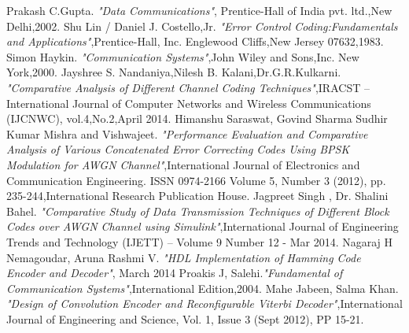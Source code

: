 \documentclass[conference]{IEEEtran}
\begin{document}
\begin{thebibliography}{50}
 Prakash C.Gupta. \textsl{"Data Communications"},
Prentice-Hall of India pvt. ltd.,New Delhi,2002.
 Shu Lin / Daniel J. Costello,Jr. \textsl{"Error Control Coding:Fundamentals and Applications"},Prentice-Hall, Inc. Englewood Cliffs,New Jersey 07632,1983.
 Simon Haykin. \textsl{"Communication Systems"},John Wiley and Sons,Inc. New York,2000.
Jayshree S. Nandaniya,Nilesh B. Kalani,Dr.G.R.Kulkarni. \textsl{"Comparative Analysis of Different Channel Coding Techniques"},IRACST – International Journal of Computer Networks and Wireless Communications (IJCNWC), vol.4,No.2,April 2014.
 Himanshu Saraswat, Govind Sharma Sudhir Kumar Mishra and Vishwajeet. \textsl{"Performance Evaluation and Comparative Analysis
of Various Concatenated Error Correcting Codes Using BPSK Modulation for AWGN Channel"},International Journal of Electronics and Communication Engineering.
ISSN 0974-2166 Volume 5, Number 3 (2012), pp. 235-244,International Research Publication House.
 Jagpreet Singh , Dr. Shalini Bahel. \textsl{"Comparative Study of Data Transmission Techniques of Different Block Codes over AWGN Channel using Simulink"},International Journal of Engineering Trends and Technology (IJETT) – Volume 9 Number 12 - Mar 2014.
 Nagaraj H Nemagoudar, Aruna Rashmi V.
\textsl{"HDL Implementation of Hamming Code Encoder and Decoder"}, March 2014
 Proakis J, Salehi.\textsl{"Fundamental of Communication
Systems"},International Edition,2004.
Mahe Jabeen, Salma Khan. \textsl{"Design of Convolution Encoder and Reconfigurable Viterbi Decoder"},International Journal of Engineering and Science, Vol. 1, Issue 3 (Sept 2012), PP 15-21.
\end{thebibliography}
\end{document}
